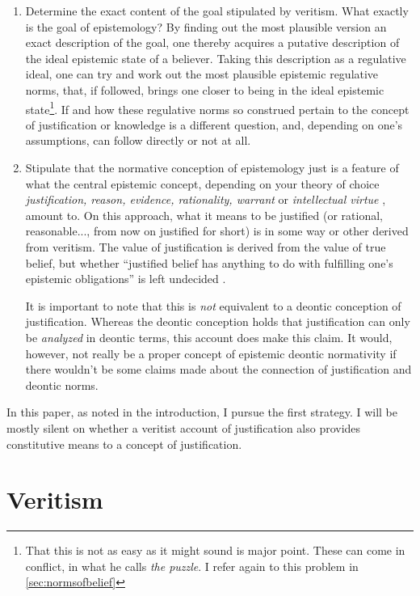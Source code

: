 \documentclass[12pt,numbers=noenddot]{scrartcl}
\begin{document}
\begin{enumerate}
    \item Determine the exact content of the goal stipulated by veritism. What exactly is the goal of epistemology? By finding out the most plausible version an exact description of the goal, one thereby acquires a putative description of the ideal epistemic state of a believer. Taking this description as a regulative ideal, one can try and work out the most plausible epistemic regulative norms, that, if followed, brings one closer to being in the ideal epistemic state\footnote{That this is not as easy as it might sound is \textcite{Gibbons2013-GIBTNO} major point. These can come in conflict, in what he calls \emph{the puzzle}. I refer again to this problem in \ref{sec:normsofbelief}}.
    If and how these regulative norms so construed pertain to the concept of justification or knowledge is a different question, and, depending on one's assumptions, can follow directly or not at all.
    \item Stipulate that the normative conception of epistemology just is a feature of what the central epistemic concept, depending on your theory of choice \emph{justification, reason, evidence, rationality, warrant} or \emph{intellectual virtue} \autocite[153]{David2001-DAVTAT-7}, amount to. On this approach, what it means to be justified (or rational, reasonable..., from now on justified for short) is in some way or other derived from veritism. The value of justification is derived from the value of true belief, but whether “justified belief has anything to do with fulfilling one's epistemic obligations” is left undecided \autocite[66]{Steup1988-STETDC}.

    It is important to note that this is \emph{not} equivalent to a deontic conception of justification. Whereas the deontic conception holds that justification can only be \emph{analyzed} in deontic terms, this account does make this claim. It would, however, not really be a proper concept of epistemic deontic normativity if there wouldn't be some claims made about the connection of justification and deontic norms.
\end{enumerate}
In this paper, as noted in the introduction, I pursue the first strategy. I will be mostly silent on whether a veritist account of justification also provides constitutive means to a concept of justification.

\clearpage

\section{Veritism}
\end{document}
